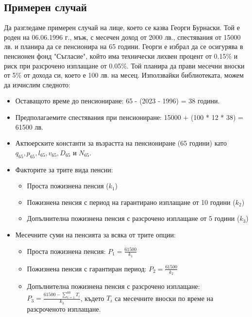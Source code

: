 \documentclass[a4paper,12pt]{article}
\begin{document}
\subsection{Примерен случай}
Да разгледаме примерен случай на лице, което се казва Георги Бурнаски. Той е роден на 06.06.1996 г., мъж, с месечен доход от 2000 лв., спестявания от 15000 лв. и планира да се пенсионира на 65 години.
\newline
Георги е избрал да се осигурява в пенсионен фонд "Съгласие", който има технически лихвен процент от 0.15\% и риск при разсрочено изплащане от 0.05\%. Той планира да прави месечни вноски от 5\% от дохода си, което е 100 лв. на месец.
\newline
\newline
Използвайки библиотеката, можем да изчислим следното:
\begin{itemize}
        \item Оставащото време до пенсиониране: 65 - (2023 - 1996) = 38 години.
        \item Предполагаемите спестявания при пенсиониране: 15000 + (100 * 12 * 38) = 61500 лв.
        \item Актюерските константи за възрастта на пенсиониране (65 години) като $q_{65}, p_{65}, l_{65}, v_{65}, D_{65}$ и $N_{65}$.
        \item Факторите за трите вида пенсии:
              \begin{itemize}
                      \item Проста пожизнена пенсия ($k_1$)
                      \item Пожизнена пенсия с период на гарантирано изплащане от 10 години ($k_2$)
                      \item Допълнителна пожизнена пенсия с разсрочено изплащане от 5 години ($k_3$)
              \end{itemize}
        \item Месечните суми на пенсията за всяка от трите опции:
              \begin{itemize}
                      \item Проста пожизнена пенсия: $P_1 = \frac{61500}{k_1}$
                      \item Пожизнена пенсия с гарантиран период: $P_2 = \frac{61500}{k_2}$
                      \item Допълнителна пожизнена пенсия с разсрочено изплащане: $P_3 = \frac{61500 - \sum_{i=1}^{60} T_i}{k_3}$, където $T_i$ са месечните вноски по време на разсроченото изплащане.
              \end{itemize}
\end{itemize}
\end{document}
